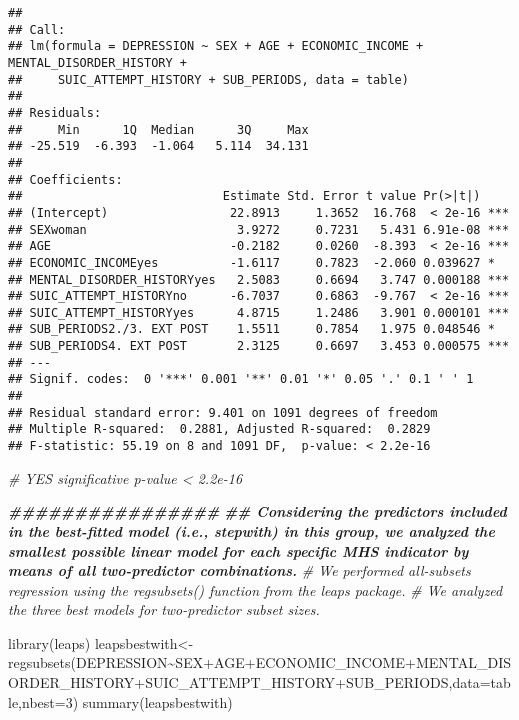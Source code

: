 \documentclass[
]{book}
\newenvironment{Shaded}{\begin{snugshade}}{\end{snugshade}}
\newcommand{\AttributeTok}[1]{\textcolor[rgb]{0.77,0.63,0.00}{#1}}
\newcommand{\CommentTok}[1]{\textcolor[rgb]{0.56,0.35,0.01}{\textit{#1}}}
\newcommand{\DecValTok}[1]{\textcolor[rgb]{0.00,0.00,0.81}{#1}}
\newcommand{\DocumentationTok}[1]{\textcolor[rgb]{0.56,0.35,0.01}{\textbf{\textit{#1}}}}
\newcommand{\FunctionTok}[1]{\textcolor[rgb]{0.00,0.00,0.00}{#1}}
\newcommand{\NormalTok}[1]{#1}
\newcommand{\OtherTok}[1]{\textcolor[rgb]{0.56,0.35,0.01}{#1}}
\newcommand{\SpecialCharTok}[1]{\textcolor[rgb]{0.00,0.00,0.00}{#1}}
\begin{document}
\begin{verbatim}
## 
## Call:
## lm(formula = DEPRESSION ~ SEX + AGE + ECONOMIC_INCOME + MENTAL_DISORDER_HISTORY + 
##     SUIC_ATTEMPT_HISTORY + SUB_PERIODS, data = table)
## 
## Residuals:
##     Min      1Q  Median      3Q     Max 
## -25.519  -6.393  -1.064   5.114  34.131 
## 
## Coefficients:
##                            Estimate Std. Error t value Pr(>|t|)    
## (Intercept)                 22.8913     1.3652  16.768  < 2e-16 ***
## SEXwoman                     3.9272     0.7231   5.431 6.91e-08 ***
## AGE                         -0.2182     0.0260  -8.393  < 2e-16 ***
## ECONOMIC_INCOMEyes          -1.6117     0.7823  -2.060 0.039627 *  
## MENTAL_DISORDER_HISTORYyes   2.5083     0.6694   3.747 0.000188 ***
## SUIC_ATTEMPT_HISTORYno      -6.7037     0.6863  -9.767  < 2e-16 ***
## SUIC_ATTEMPT_HISTORYyes      4.8715     1.2486   3.901 0.000101 ***
## SUB_PERIODS2./3. EXT POST    1.5511     0.7854   1.975 0.048546 *  
## SUB_PERIODS4. EXT POST       2.3125     0.6697   3.453 0.000575 ***
## ---
## Signif. codes:  0 '***' 0.001 '**' 0.01 '*' 0.05 '.' 0.1 ' ' 1
## 
## Residual standard error: 9.401 on 1091 degrees of freedom
## Multiple R-squared:  0.2881, Adjusted R-squared:  0.2829 
## F-statistic: 55.19 on 8 and 1091 DF,  p-value: < 2.2e-16
\end{verbatim}

\begin{Shaded}
\begin{Highlighting}[]
\CommentTok{\# YES significative p{-}value \textless{} 2.2e{-}16}




\DocumentationTok{\#\#\#\#\#\#\#\#\#\#\#\#\#\#\#\#}
\DocumentationTok{\#\# Considering the predictors included in the best{-}fitted model (i.e., stepwith) in this group, we analyzed the smallest possible linear model for each specific MHS indicator by means of all two{-}predictor combinations.  }
\CommentTok{\# We performed all{-}subsets regression using the regsubsets() function from the leaps package.}
\CommentTok{\# We analyzed the three best models for two{-}predictor subset sizes.}

\FunctionTok{library}\NormalTok{(leaps)}
\NormalTok{leapsbestwith}\OtherTok{\textless{}{-}}\FunctionTok{regsubsets}\NormalTok{(DEPRESSION}\SpecialCharTok{\textasciitilde{}}\NormalTok{SEX}\SpecialCharTok{+}\NormalTok{AGE}\SpecialCharTok{+}\NormalTok{ECONOMIC\_INCOME}\SpecialCharTok{+}\NormalTok{MENTAL\_DISORDER\_HISTORY}\SpecialCharTok{+}\NormalTok{SUIC\_ATTEMPT\_HISTORY}\SpecialCharTok{+}\NormalTok{SUB\_PERIODS,}\AttributeTok{data=}\NormalTok{table,}\AttributeTok{nbest=}\DecValTok{3}\NormalTok{)}
\FunctionTok{summary}\NormalTok{(leapsbestwith)}
\end{Highlighting}
\end{Shaded}
\end{document}
